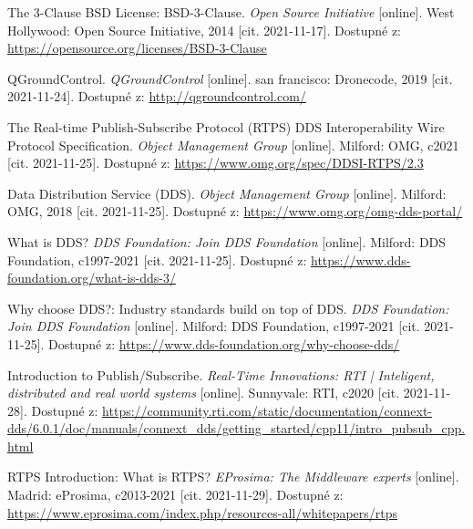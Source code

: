 

\begin{thebibliography}{99}
	
The 3-Clause BSD License: BSD-3-Clause. \textit{Open Source Initiative} [online]. West Hollywood: Open Source Initiative, 2014 [cit. 2021-11-17]. Dostupné z: \url{https://opensource.org/licenses/BSD-3-Clause}

QGroundControl. \textit{QGroundControl} [online]. san francisco: Dronecode, 2019 [cit. 2021-11-24]. Dostupné z: \url{http://qgroundcontrol.com/}

The Real-time Publish-Subscribe Protocol (RTPS) DDS Interoperability Wire Protocol Specification. \textit{Object Management Group} [online]. Milford: OMG, c2021 [cit. 2021-11-25]. Dostupné z: \url{https://www.omg.org/spec/DDSI-RTPS/2.3}
	
Data Distribution Service (DDS). \textit{Object Management Group} [online]. Milford: OMG, 2018 [cit. 2021-11-25]. Dostupné z: \url{https://www.omg.org/omg-dds-portal/}

What is DDS? \textit{DDS Foundation: Join DDS Foundation} [online]. Milford: DDS Foundation, c1997-2021 [cit. 2021-11-25]. Dostupné z: \url{https://www.dds-foundation.org/what-is-dds-3/}

Why choose DDS?: Industry standards build on top of DDS. \textit{DDS Foundation: Join DDS Foundation} [online]. Milford: DDS Foundation, c1997-2021 [cit. 2021-11-25]. Dostupné z: \url{https://www.dds-foundation.org/why-choose-dds/}

Introduction to Publish/Subscribe. \textit{Real-Time Innovations: RTI | Inteligent, distributed and real world systems} [online]. Sunnyvale: RTI, c2020 [cit. 2021-11-28]. Dostupné z: \url{https://community.rti.com/static/documentation/connext-dds/6.0.1/doc/manuals/connext\_dds/getting\_started/cpp11/intro\_pubsub\_cpp.html}

RTPS Introduction: What is RTPS? \textit{EProsima: The Middleware experts} [online]. Madrid: eProsima, c2013-2021 [cit. 2021-11-29]. Dostupné z: \url{https://www.eprosima.com/index.php/resources-all/whitepapers/rtps}


\end{thebibliography}
